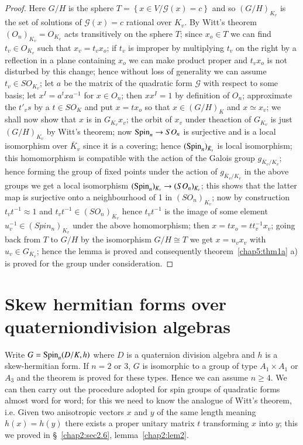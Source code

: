 \begin{proof}
Here $G/H$ is the sphere $T = \left \{ x \in V \bigg/ \mathscr{G}(x) =
c \right \}$ and so $(G/H)_{K_v}$ is the set of solutions of
$\mathscr{G}(x) = c$ rational over $K_v$. By Witt's theorem
$(O_n)_{K_v} = O_{K_v}$ acts transitively on the sphere $T$; since
$x_o \in T$ we can find $t_v \in O_{K_v}$ such that $x_v = t_v x_o$;
if $t_v$ is improper by multiplying $t_v$ on the right by a reflection
in a plane containing $x_o$ we can make product proper and $t_v x_o$
is not disturbed by this change; hence without loss of generality we
can assume $t_v \in SO_{K_v}$; let $a$ be the matrix of the quadratic
form $\mathscr{G}$ with respect to some basis; let $x^I = a^t x
a^{-1}$ for $x \in O_n$; then $xx^I = 1$ by definition of $O_n$;
approximate the $t'_v s$ by a $t \in SO_K$ and put $x = tx_o$ so that
$x \in (G/H)_K$ and $x \simeq x_v$; we shall now show that $x$ is in
$G_{K_v}x_v$; the orbit of $x_v$ under the\pageoriginale action of
$G_{K_v}$ is just 
$(G/H)_{K_v}$ by Witt's theorem; now $\operatorname{Spin}_n \to SO_n$ is surjective
and is a local isomorphism over $\bar{K}_v$ since it is a covering;
hence $(\operatorname{Spin}_n)_{\bar{K}_v}$ is local isomorphism; this homomorphism
is compatible with the action of the Galois group $g_{\bar{K}_v/K_v}$;
hence forming the group of fixed points under the action of
$g_{\bar{K}_v / K_v}$ in the above groups we get a local isomorphism
$(\operatorname{Spin}_n)_{K_v}\to (SO_n)_{K_v}$; this shows that the latter map is
surjective  onto a neighbourhood of 1 in $(SO_n)_{K_v}$; now by
construction $t_vt^{-1} \approx 1$ and $t_vt^{-1}\in (SO_n)_{K_v}$
hence $t_vt^{-1}$ is the image of some element $u^{-1}_v \in
(Spin_n)_{K_v}$ under the above homomorphism; then $x = tx_o =
tt^{-1}_vx_v$; going back from $T$ to $G/H$ by the isomorphism $G/H
\cong T$ we get $x = u_v x_v$ with $u_v \in G_{K_v}$; hence the lemma
is proved and consequently theorem~\ref{chap5:thm1a} a) is proved for
the group under consideration. 
\end{proof}  
      

\section[Skew hermitian forms over quaternion division
  algebras]{Skew hermitian forms over quaternion\hfil\break division
  algebras}\label{chap5:sec5.10} 
      
Write $G = \operatorname{Spin}_n(D/K, h)$ where $D$ is a quaternion division algebra
and $h$ is a skew-hermitian form. If $n = 2$ or 3, $G$ is isomorphic
to a group of type $A_1 \times A_1$ or $A_3$ and the theorem is proved
for these types. Hence we can assume $n \ge 4$. We can then carry out
the procedure adopted for spin groups of quadratic forms almost word
for word; for 
this we need to know the analogue of Witt's theorem, i.e. Given two
anisotropic vectors $x$ and $y$ of the same length meaning $h(x) =
h(y)$ there exists a proper unitary matrix $t$ transforming $x$ into
$y$; this we proved in \S~\ref{chap2:sec2.6}, lemma~\ref{chap2:lem2}.

